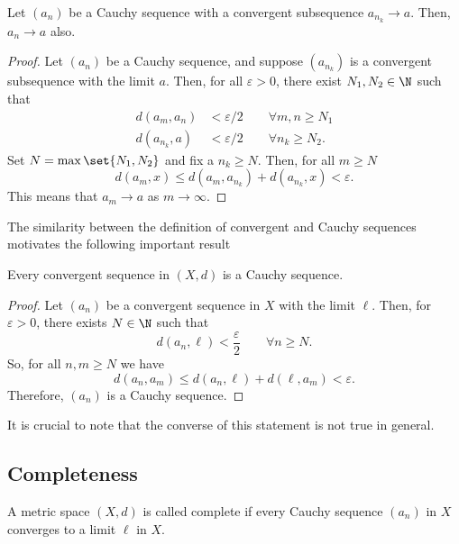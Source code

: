 \begin{nthm}
  Let $(a_n)$ be a Cauchy sequence with a convergent subsequence $a_{n_{k}} \to a$. Then, $a_n \to a$ also.
\end{nthm}
\begin{proof}
  Let $(a_n)$ be a Cauchy sequence, and suppose $(a_{n_{k}})$ is a convergent subsequence with the limit $a$. Then, for all $\varepsilon>0$, there exist $N_1, N_2 \in \N$ such that
  \begin{align*}
    d(a_m, a_n) &<\varepsilon/2 \qquad\forall m,n\geq N_1\\
    d(a_{n_{k}}, a) &<\varepsilon/2 \qquad\forall n_{k}\geq N_2.
  \end{align*}
  Set $N = \max\set{N_1, N_2}$ and fix a $n_k \geq N$. Then, for all $m \geq N$
  \begin{equation*}
    d(a_m, x) \leq d(a_m, a_{n_{k}}) + d(a_{n_{k}}, x)
    < \varepsilon.
  \end{equation*}
  This means that $a_m \to a$ as $m \to \infty$.
\end{proof}

The similarity between the definition of convergent and Cauchy sequences motivates the following important result
\begin{nthm}
  Every convergent sequence in $(X,d)$ is a Cauchy sequence.
\end{nthm}
\begin{proof}
  Let $(a_n)$ be a convergent sequence in $X$ with the limit $\ell$. Then, for $\varepsilon > 0$, there exists $N \in \N$ such that
  \begin{equation*}
    d(a_n, \ell) < \frac{\varepsilon}{2}
    \qquad\forall n \geq N.
  \end{equation*}
  So, for all $n,m \geq N$ we have
  \begin{equation*}
    d(a_n, a_m) \leq d(a_n, \ell) + d(\ell, a_m) < \varepsilon.
  \end{equation*}
  Therefore, $(a_n)$ is a Cauchy sequence.
\end{proof}
It is crucial to note that the converse of this statement is not true in general.

\subsection{Completeness}
\begin{ndfn}
  A metric space $(X,d)$ is called complete if every Cauchy sequence $(a_n)$ in $X$ converges to a limit $\ell$ in $X$.
\end{ndfn}

